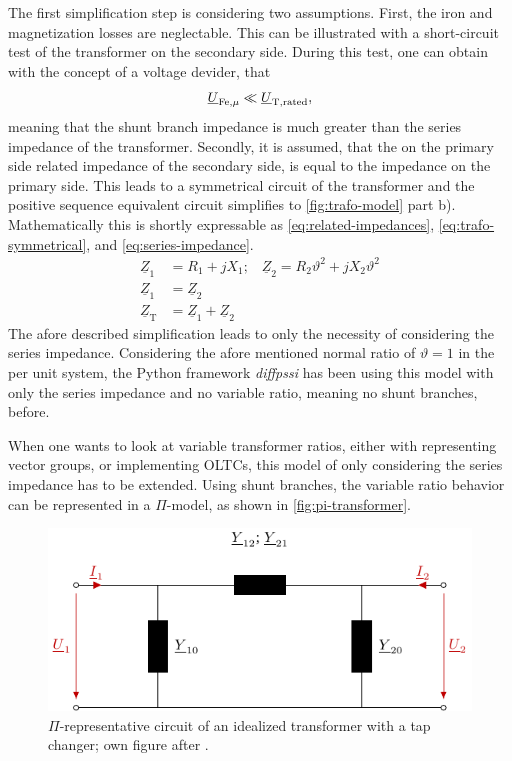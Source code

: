 The first simplification step is considering two assumptions. 
First, the iron and magnetization losses are neglectable. 
This can be illustrated with a short-circuit test of the transformer on the secondary side. 
During this test, one can obtain with the concept of a voltage devider, that
\begin{align}
    \underline{U}_\mathrm{Fe, \mu} \ll \underline{U}_\mathrm{T,rated}, \notag
\end{align}
meaning that the shunt branch impedance is much greater than the series impedance of the transformer. 
Secondly, it is assumed, that the on the primary side related impedance of the secondary side, is equal to the impedance on the primary side. 
This leads to a symmetrical circuit of the transformer and the positive sequence equivalent circuit simplifies to \autoref{fig:trafo-model} part b). 
Mathematically this is shortly expressable as \autoref{eq:related-impedances}, \autoref{eq:trafo-symmetrical}, and \autoref{eq:series-impedance}. \autocite{machowski_2020,kundur_2022,milano_2010}
\begin{align}
    \underline{Z}_1 &= R_1 + jX_1\text{;}\quad\underline{Z}_2 = R_2 \vartheta^2 + jX_2 \vartheta^2 \label{eq:related-impedances} \\
    \underline{Z}_1 &= \underline{Z}_2 \label{eq:trafo-symmetrical} \\
    \underline{Z}_\mathrm{T} &= \underline{Z}_1 + \underline{Z}_2 \label{eq:series-impedance}
\end{align}
The afore described simplification leads to only the necessity of considering the series impedance. 
Considering the afore mentioned normal ratio of $\vartheta=1$ in the per unit system, the Python framework \textit{diffpssi} has been using this model with only the series impedance and no variable ratio, meaning no shunt branches, before.

When one wants to look at variable transformer ratios, either with representing vector groups, or implementing \acfp{OLTC}, this model of only considering the series impedance has to be extended. 
Using shunt branches, the variable ratio behavior can be represented in a $\Pi$-model, as shown in \autoref{fig:pi-transformer}. \autocite{machowski_2020,kundur_2022,milano_2010}

\begin{figure}%
    \centering
    \includegraphics[width=.7\textwidth]{tikz_graphics/images/transformer_pi.pdf}
    \caption[$\Pi$-representative circuit of an idealized transformer with a tap changer]{$\Pi$-representative circuit of an idealized transformer with a tap changer; own figure after \autocite{milano_2010,burlakin_2024}.}
    \label{fig:pi-transformer}
\end{figure}

